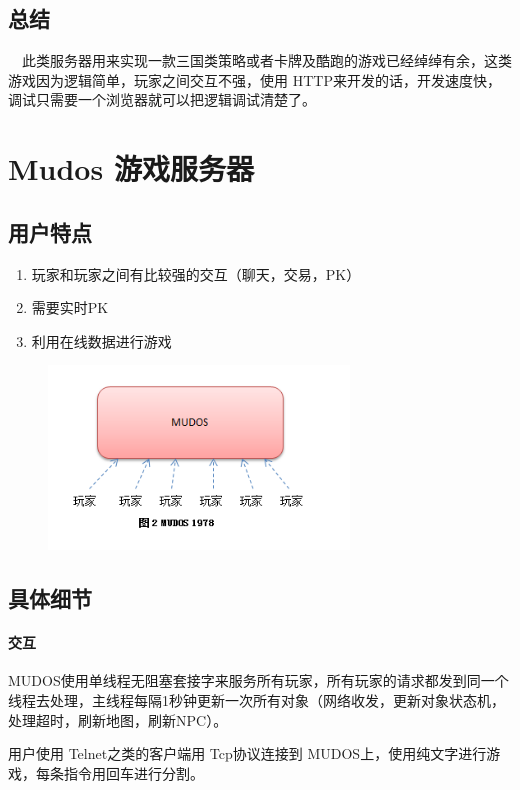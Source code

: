 \documentclass[UTF8,a4paper,8pt]{ctexart}
\begin{document}
	 \subsection{总结}　此类服务器用来实现一款三国类策略或者卡牌及酷跑的游戏已经绰绰有余，这类游戏因为逻辑简单，玩家之间交互不强，使用 HTTP来开发的话，开发速度快，调试只需要一个浏览器就可以把逻辑调试清楚了。
\newpage
\section{Mudos 游戏服务器}
		\subsection{用户特点}
			\begin{enumerate}[fullwidth,itemindent = 2em]
				\item  玩家和玩家之间有比较强的交互（聊天，交易，PK）
				\item  需要实时PK
				\item  利用在线数据进行游戏
			\end{enumerate}
			
			\begin{figure}[h] 	
				\centering
				\includegraphics[width=8cm,clip]{gameServer2.png} 	
				\label{fig:gameServer2}
			\end{figure} 
	   \subsection{具体细节}
		  
			\paragraph{交互}MUDOS使用单线程无阻塞套接字来服务所有玩家，所有玩家的请求都发到同一个线程去处理，主线程每隔1秒钟更新一次所有对象（网络收发，更新对象状态机，处理超时，刷新地图，刷新NPC）。
			
			用户使用 Telnet之类的客户端用 Tcp协议连接到 MUDOS上，使用纯文字进行游戏，每条指令用回车进行分割。
			
\end{document}

